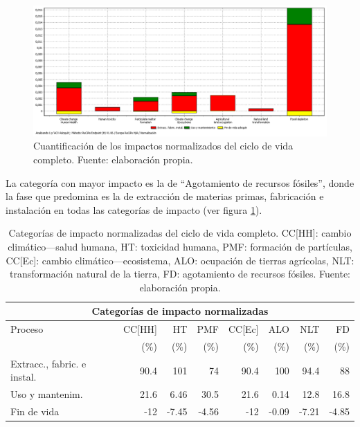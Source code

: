 \begin{figure}[!htb]
\centering
\includegraphics[width=15cm]{img/completo_normalizacion.png}
\caption[Cuantificación de los impactos normalizados del ciclo de vida completo.]{Cuantificación de los impactos normalizados del ciclo de vida completo. Fuente: elaboración propia.}
\label{fig:completo_normalizacion}
\end{figure}

La categoría con mayor impacto es la de ``Agotamiento de recursos fósiles'', donde la fase que predomina es la de extracción de materias primas, fabricación e instalación en todas las categorías de impacto (ver figura \ref{fig:completo_normalizacion}).

\begin{table}[!htb]
\centering
\begin{tabular}{p{4cm}rrrrrrr}
\toprule
\multicolumn{8}{c}{Categorías de impacto normalizadas}\\
\midrule
Proceso & CC[HH] & HT & PMF & CC[Ec] & ALO & NLT & FD\\
 &  (\%) & (\%) & (\%) & (\%) & (\%) & (\%) & (\%)\\
\midrule
Extracc., fabric. e instal. & 90.4 & 101 & 74 & 90.4 & 100 & 94.4 & 88\\
Uso y mantenim. & 21.6 & 6.46 & 30.5 & 21.6 & 0.14 & 12.8 & 16.8\\
Fin de vida & -12 & -7.45 & -4.56 & -12 & -0.09 & -7.21 & -4.85\\
\bottomrule
\end{tabular}
\caption[Categorías de impacto normalizadas del ciclo de vida completo.]{Categorías de impacto normalizadas del ciclo de vida completo. CC[HH]: cambio climático—salud humana, HT: toxicidad humana, PMF: formación de partículas, CC[Ec]: cambio climático—ecosistema, ALO: ocupación de tierras agrícolas, NLT: transformación natural de la tierra, FD: agotamiento de recursos fósiles. Fuente: elaboración propia.}
\label{categoriasimpactocompleto}
\end{table}

